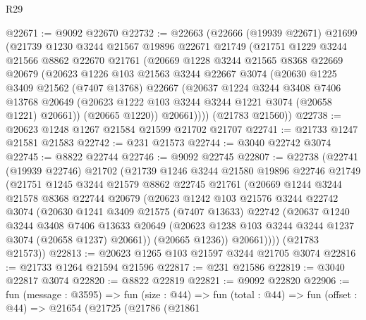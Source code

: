 \begin{lexlean}{R29}
\begin{coremodule}
@22671 := @9092 @22670
@22732 := @22663
    (@22666
      (@19939 @22671)
      @21699
      (@21739
        @1230
        @3244
        @21567
        @19896
        @22671
        @21749
        (@21751
          @1229
          @3244
          @21566
          @8862
          @22670
          @21761
          (@20669
            @1228
            @3244
            @21565
            @8368
            @22669
            @20679
            (@20623
              @1226
              @103
              @21563
              @3244
              @22667
              @3074
              (@20630
                @1225
                @3409
                @21562
                (@7407 @13768)
                @22667
                (@20637
                  @1224
                  @3244
                  @3408
                  @7406
                  @13768
                  @20649
                  (@20623 @1222 @103 @3244 @3244 @1221 @3074 (@20658 @1221) @20661))
                (@20665 @1220))
              @20661))))
      (@21783 @21560))
@22738 := @20623 @1248 @1267 @21584 @21599 @21702 @21707
@22741 := @21733 @1247 @21581 @21583
@22742 := @231 @21573
@22744 := @3040 @22742 @3074
@22745 := @8822 @22744
@22746 := @9092 @22745
@22807 := @22738
    (@22741
      (@19939 @22746)
      @21702
      (@21739
        @1246
        @3244
        @21580
        @19896
        @22746
        @21749
        (@21751
          @1245
          @3244
          @21579
          @8862
          @22745
          @21761
          (@20669
            @1244
            @3244
            @21578
            @8368
            @22744
            @20679
            (@20623
              @1242
              @103
              @21576
              @3244
              @22742
              @3074
              (@20630
                @1241
                @3409
                @21575
                (@7407 @13633)
                @22742
                (@20637
                  @1240
                  @3244
                  @3408
                  @7406
                  @13633
                  @20649
                  (@20623 @1238 @103 @3244 @3244 @1237 @3074 (@20658 @1237) @20661))
                (@20665 @1236))
              @20661))))
      (@21783 @21573))
@22813 := @20623 @1265 @103 @21597 @3244 @21705 @3074
@22816 := @21733 @1264 @21594 @21596
@22817 := @231 @21586
@22819 := @3040 @22817 @3074
@22820 := @8822 @22819
@22821 := @9092 @22820
@22906 := fun (message : @3595) =>
  fun (size : @44) =>
  fun (total : @44) =>
  fun (offset : @44) =>
  @21654
    (@21725
      (@21786
        (@21861

\end{coremodule}
\end{lexlean}

